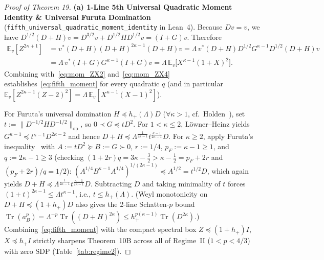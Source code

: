 \documentclass[10pt,letterpaper]{article}
\newcommand{\Tr}{\operatorname{Tr}}
\newcommand{\op}{\mathrm{op}}
\begin{document}
\begin{proof}[Proof of Theorem 19]
\textbf{(a) 1-Line 5th Universal Quadratic Moment Identity \& Universal Furuta Domination} (\texttt{fifth\_universal\_quadratic\_moment\_identity} in Lean~4).
Because $Dv = v$, we have $D^{1/2}(D+H)v = D^{3/2} v + D^{1/2} H D^{1/2} v = (I + G)v$. Therefore
\begin{align*}
  \mathbb{E}_v[Z^{2\kappa+1}]
  &= v^*(D+H)(D+H)^{2\kappa-1}(D+H)v
   = \Lambda\,v^*(D+H)D^{1/2} G^{\kappa-1} D^{1/2}(D+H)v \\
  &= \Lambda\,v^*(I+G)G^{\kappa-1}(I+G)v
   = \Lambda\,\mathbb{E}_v\bigl[X^{\kappa-1}(1+X)^2\bigr].
\end{align*}
Combining with~\eqref{eq:mom_ZX2} and~\eqref{eq:mom_ZX4} establishes~\eqref{eq:fifth_moment} for every quadratic $q$ (and in particular $\mathbb{E}_v[Z^{2\kappa-1}(Z-2)^2] = \Lambda\,\mathbb{E}_v[X^{\kappa-1}(X-1)^2]$).

For Furuta's universal domination $H \preceq h_+(\Lambda) D$ ($\forall \kappa > 1$, cf.\ Holden~\cite[Thm.~4.2]{Holden2026b}), set $t := \|D^{-1/2} H D^{-1/2}\|_{\op}$, so $0 \prec G \preceq t D^2$. For $1 < \kappa \le 2$, L\"owner--Heinz yields $G^{\kappa-1} \preceq t^{\kappa-1} D^{2\kappa-2}$ and hence $D+H \preceq \Lambda^{\frac{1}{2\kappa-1}} t^{\frac{\kappa-1}{2\kappa-1}} D$. For $\kappa \ge 2$, apply Furuta's inequality~\cite{Furuta1987} with $A := t D^2 \succeq B := G \succ 0$, $r := 1/4$, $p_F := \kappa-1 \ge 1$, and $q := 2\kappa-1 \ge 3$ (checking $(1+2r)q = 3\kappa - \frac{3}{2} > \kappa - \frac{1}{2} = p_F + 2r$ and $(p_F + 2r)/q = 1/2$): $(A^{1/4} B^{\kappa-1} A^{1/4})^{1/(2\kappa-1)} \preceq A^{1/2} = t^{1/2} D$, which again yields $D+H \preceq \Lambda^{\frac{1}{2\kappa-1}} t^{\frac{\kappa-1}{2\kappa-1}} D$. Subtracting $D$ and taking minimality of $t$ forces $(1+t)^{2\kappa-1} \le \Lambda t^{\kappa-1}$, i.e., $t \le h_+(\Lambda)$. (Weyl monotonicity on $D+H \preceq (1+h_+)D$ also gives the 2-line Schatten-$p$ bound $\Tr(a_B^p) = \Lambda^{-p}\Tr((D+H)^{2\kappa}) \le h_+^{p(\kappa-1)}\Tr(D^{2\kappa})$.) Combining~\eqref{eq:fifth_moment} with the compact spectral box $Z \preceq (1+h_+)I$, $X \preceq h_+ I$ strictly sharpens Theorem~10B across all of Regime~II ($1 < p < 4/3$) with zero SDP (Table~\ref{tab:regime2}).


\end{proof}
\end{document}
